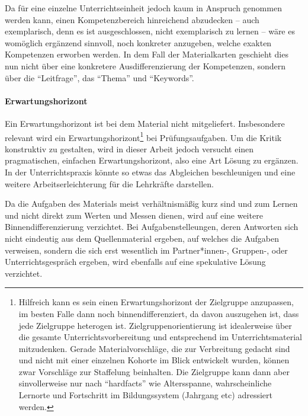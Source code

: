 


Da für eine einzelne Unterrichtseinheit jedoch kaum in Anspruch genommen werden kann, einen Kompetenzbereich hinreichend abzudecken -- auch exemplarisch, denn es ist ausgeschlossen, nicht exemplarisch zu lernen -- wäre es womöglich ergänzend sinnvoll, noch konkreter anzugeben, welche exakten Kompetenzen erworben werden.
In dem Fall der Materialkarten geschieht dies nun nicht über eine konkretere Ausdifferenzierung der Kompetenzen, sondern über die \enquote{Leitfrage}, das \enquote{Thema} und \enquote{Keywords}. 


\paragraph{Erwartungshorizont}
Ein Erwartungshorizont ist bei dem Material nicht mitgeliefert. Insbesondere relevant wird ein Erwartungshorizont\footnote{
    Hilfreich kann es sein einen Erwartungshorizont der Zielgruppe anzupassen, im besten Falle dann noch binnendifferenziert, da davon auszugehen ist, dass jede Zielgruppe heterogen ist. 
    Zielgruppenorientierung ist idealerweise über die gesamte Unterrichtsvorbereitung und entsprechend im Unterrichtsmaterial mitzudenken. Gerade Materialvorschläge, die zur Verbreitung gedacht sind und nicht mit einer einzelnen Kohorte im Blick entwickelt wurden, können zwar Vorschläge zur Staffelung beinhalten. Die Zielgruppe kann dann aber sinvollerweise nur nach \enquote{hardfacts} wie Altersspanne, wahrscheinliche Lernorte und Fortschritt im Bildungssystem (Jahrgang \gls{etc}) adressiert werden.} 
 bei Prüfungsaufgaben.
Um die Kritik konstruktiv zu gestalten, wird in dieser Arbeit jedoch versucht einen pragmatischen, einfachen Erwartungshorizont, also eine Art Lösung zu ergänzen. In der Unterrichtspraxis könnte so etwas das Abgleichen beschleunigen und eine weitere Arbeitserleichterung für die Lehrkräfte darstellen. 

Da die Aufgaben des Materials meist verhältnismäßig kurz sind und zum Lernen und nicht direkt zum Werten und Messen dienen, wird auf eine weitere Binnendifferenzierung verzichtet. Bei Aufgabenstelleungen, deren Antworten sich nicht eindeutig aus dem Quellenmaterial ergeben, auf welches die Aufgaben verweisen, sondern die sich erst wesentlich im Partner*innen-, Gruppen-, oder Unterrichtsgespräch ergeben, wird ebenfalls auf eine spekulative Lösung verzichtet. 

